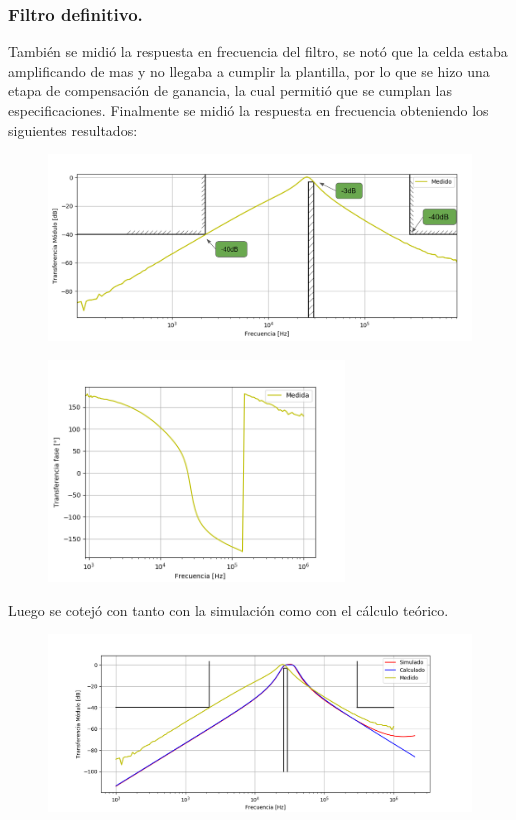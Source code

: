 \subsubsection{Filtro definitivo.}

También se midió la respuesta en frecuencia del filtro, se notó que la celda estaba amplificando de mas y no llegaba a cumplir la plantilla, por lo que se hizo una etapa de compensación de ganancia, la cual permitió que se cumplan las especificaciones. Finalmente se midió la respuesta en frecuencia obteniendo los siguientes resultados:
\begin{figure}[H]
	\centering
	\includegraphics[width=\textwidth]{Imagenes-Ej2/BodeRauch.png}
	\label{fig:graph}
\end{figure}
\begin{figure}[H]
	\centering
	\includegraphics[width=0.7\textwidth]{Imagenes-Ej2/BodeRauchFase.png}
	\label{fig:graph}
\end{figure}
Luego se cotejó con tanto con la simulación como con el cálculo teórico.
\begin{figure}[H]
	\centering
	\includegraphics[width=\textwidth]{Imagenes-Ej2/BodeRauchCalcsim.png}
	\label{fig:Bodecalcsim}
\end{figure}
